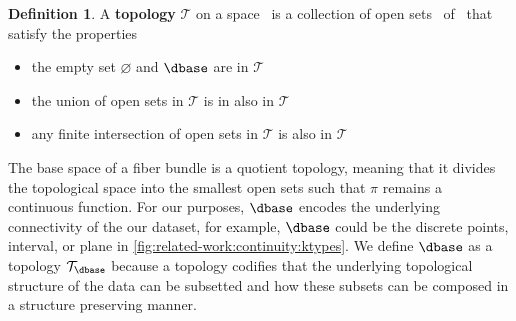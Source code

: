 \documentclass[10pt,journal,compsoc]{IEEEtran}
\theoremstyle{definition}
\newtheorem{definition}{Definition}[section]
\theoremstyle{remark}
\begin{document}
\begin{definition}
A \textbf{topology} $\mathcal{T}$ on a space \dbase\ is a collection of open sets \openset\ of \dbase\ that satisfy the properties 
  \begin{itemize}
    \item the empty set $\varnothing$ and $\dbase$ are in $\mathcal{T}$
    \item the union of open sets in $\mathcal{T}$ is in also in $\mathcal{T}$
    \item any finite intersection of open sets in $\mathcal{T}$ is also in $\mathscr{T}$
  \end{itemize}
\end{definition}
The base space of a fiber bundle is a quotient topology\cite{QuotientSpaceTopology2020}, meaning that it divides the topological space into the smallest open sets such that $\pi$ remains a continuous function.  For our purposes, $\dbase$ encodes the underlying connectivity of the our dataset, for example, $\dbase$ could be the discrete points, interval, or plane in \autoref{fig:related-work:continuity:ktypes}. We define $\dbase$ as a topology $\mathcal{T}_{\dbase}$ because a topology codifies that the underlying topological structure of the data can be subsetted and how these subsets can be composed in a structure preserving manner. 
\end{document}

